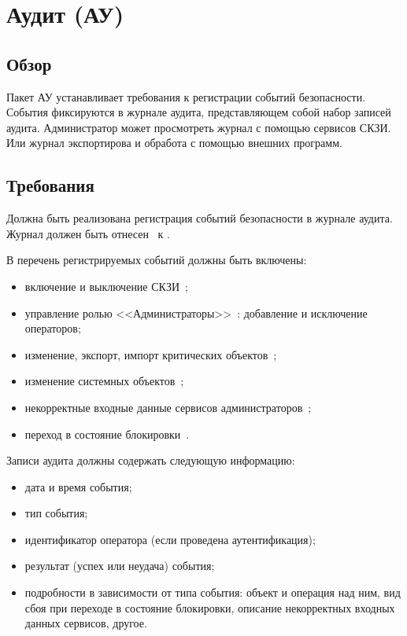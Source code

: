 \section{Аудит (АУ)}\label{AU}

\subsection{Обзор}\label{AU.Defs}

Пакет АУ устанавливает требования к регистрации событий безопасности.
События фиксируются в журнале аудита, представляющем собой набор 
записей аудита.
%
Администратор может просмотреть журнал с помощью сервисов СКЗИ.
Или журнал  экспортирова 
и обработа с помощью внешних программ.

\subsection{Требования}\label{AU.Reqs}


\label{R.AU.Log}
Должна быть реализована регистрация событий безопасности в журнале аудита. 
Журнал должен быть отнесен~ к .

\label{R.AU.Events}
В перечень регистрируемых событий должны быть включены:
\begin{itemize} 
\item
включение и выключение СКЗИ~;
\item
управление ролью <<Администраторы>>~: 
добавление и исключение операторов; 
\item
изменение, экспорт, импорт критических объектов~; 
\item
изменение системных объектов~; 
\item
некорректные входные данные сервисов администраторов~;
\item
переход в состояние блокировки~.
\end{itemize}

\begin{note}
\end{note}

\label{R.AU.Records}
Записи аудита должны содержать следующую информацию:
\begin{itemize} 
\item
дата и время события;
\item
тип события; 
\item
идентификатор оператора (если проведена аутентификация); 
\item
результат (успех или неудача) события; 
\item
подробности в зависимости от типа события:
объект и операция над ним,
вид сбоя при переходе в состояние блокировки,
описание некорректных входных данных сервисов,
другое.
\end{itemize}

